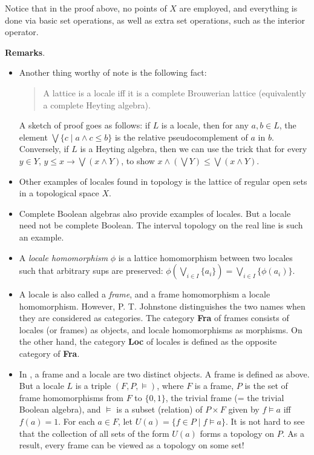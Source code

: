 \documentclass[12pt]{article}
\begin{document}
Notice that in the proof above, no points of $X$ are employed, and everything is done via basic set operations, as well as extra set operations, such as the interior operator.

\textbf{Remarks}.  
\begin{itemize}
\item Another thing worthy of note is the following fact: 
\begin{quote}
A lattice is a locale iff it is a complete Brouwerian lattice (equivalently a complete Heyting algebra).
\end{quote}
A sketch of proof goes as follows: if $L$ is a locale, then for any $a,b\in L$, the element $\bigvee \lbrace c\mid a\wedge c\le b\rbrace$ is the relative pseudocomplement of $a$ in $b$.  Conversely, if $L$ is a Heyting algebra, then we can use the trick that for every $y\in Y$, $y\le x\to \bigvee (x\wedge Y)$, to show $x\wedge (\bigvee Y)\le \bigvee (x\wedge Y)$.
\item Other examples of locales found in topology is the lattice of regular open sets in a topological space $X$.
\item Complete Boolean algebras also provide examples of locales.  But a locale need not be complete Boolean.  The interval topology on the real line is such an example.
\item A \emph{locale homomorphism} $\phi$ is a lattice homomorphism between two locales such that arbitrary sups are preserved: $\phi(\bigvee_{i\in I} \lbrace a_i\rbrace) = \bigvee_{i\in I} \lbrace \phi(a_i)\rbrace$.
\item A locale is also called a \emph{frame}, and a frame homomorphism a locale homomorphism.  However, P. T. Johnstone distinguishes the two names when they are considered as categories.  The category \textbf{Fra} of frames consists of locales (or frames) as objects, and locale homomorphisms as morphisms.  On the other hand, the category \textbf{Loc} of locales is defined as the opposite category of \textbf{Fra}.
\item In \cite{sv}, a frame and a locale are two distinct objects.  A frame is defined as above.  But a locale $L$ is a  triple $(F,P,\models)$, where $F$ is a frame, $P$ is the set of frame homomorphisms from $F$ to $\lbrace 0,1\rbrace$, the trivial frame (= the trivial Boolean algebra), and $\models$ is a subset (relation) of $P\times F$ given by $f \models a$ iff $f(a)=1$.  For each $a\in F$, let $U(a)=\lbrace f\in P\mid f\models a\rbrace$.  It is not hard to see that the collection of all sets of the form $U(a)$ forms a topology on $P$.  As a result, every frame can be viewed as a topology on some set!
\end{itemize}
\end{document}
